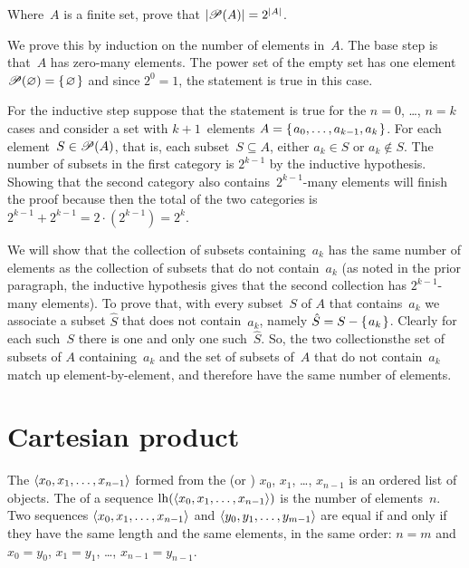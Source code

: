 \documentclass{ibl}  %
\begin{document}
\begin{ex}
Where~$A$ is a finite set, prove that $|\mathscr{P}(A)|=2^{|A|}$.    
\begin{ans}
We prove this by induction on the number of elements in~$A$.
The base step is that~$A$ has zero-many elements.
The power set of the empty set has
one element $\mathscr{P}(\varnothing)=\mbox{$\{\hspace{0.1em}\varnothing\hspace{0.1em}\}$}$ and
since $2^0=1$, the statement is true in this case. 

For the inductive step suppose that the statement is true for the 
$n=0$, \ldots, $n=k$ cases and consider a set
with $k+1$~elements
$A=\mbox{$\{\hspace{0.1em}a_0, \ldots, a_{k-1},a_k\hspace{0.1em}\}$}$.
For each element~$S\in\mathscr{P}(A)$, that is, each subset~$S\subseteq A$,
either $a_k\in S$ or $a_k\notin S$.
The number of subsets in the first category is $2^{k-1}$ by the inductive
hypothesis.
Showing that 
the second category also contains~$2^{k-1}$-many elements will finish the proof
because then
the total of the two categories is 
$2^{k-1}+2^{k-1}=2\cdot(2^{k-1})=2^k$.

We will show that the collection of subsets containing~$a_k$
has the same number of elements as the collection of subsets that do not
contain~$a_k$
(as noted in the prior paragraph, the inductive hypothesis gives that
the second collection has $2^{k-1}$-many elements).
To prove that, with every subset~$S$ of $A$ that contains~$a_k$ we associate
a subset $\hat{S}$ that does not contain~$a_k$,
namely $\hat{S}=S-\mbox{$\{\hspace{0.1em}a_k\hspace{0.1em}\}$}$.
Clearly for each such~$S$ there is one and only one such~$\hat{S}$.
So, the two collections\Dash the set of subsets of $A$ containing~$a_k$
and the set of subsets of~$A$ that do not contain~$a_k$\Dash match
up element-by-element, and therefore have the same number of elements.
\end{ans}
\end{ex}





\section{Cartesian product}

\begin{df}
The  $\langle x_0, x_1, \ldots, x_{n-1}\rangle$
formed from the  
(or ) $x_0$, $x_1$, \ldots, $x_{n-1}$ 
is an ordered list of objects.
The  of a sequence $\operatorname*{lh}(\langle x_0, x_1, \ldots, x_{n-1}\rangle)$
is the number of elements~$n$.
Two sequences $\langle x_0, x_1, \ldots, x_{n-1}\rangle$ and
$\langle y_0, y_1, \ldots, y_{m-1}\rangle$ are equal if and only if
they have the same length and
the same elements, in the same order:
$n=m$ and
$x_0=y_0$, $x_1=y_1$, \ldots, $x_{n-1}=y_{n-1}$. 
\end{df}
\end{document}
